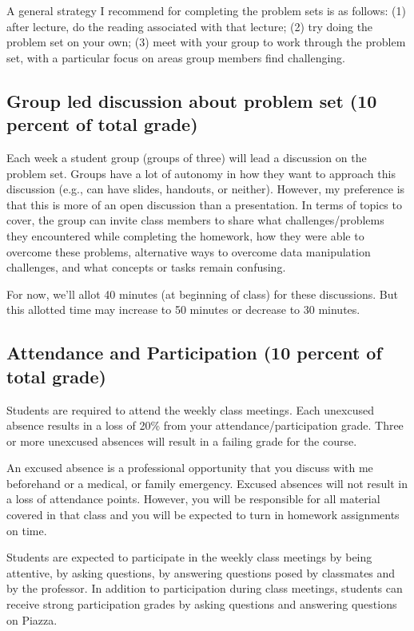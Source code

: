 \documentclass[11pt,]{article}
\begin{document}
A general strategy I recommend for completing the problem sets is as
follows: (1) after lecture, do the reading associated with that lecture;
(2) try doing the problem set on your own; (3) meet with your group to
work through the problem set, with a particular focus on areas group
members find challenging.

\subsection{Group led discussion about problem set (10 percent of total
grade)}\label{group-led-discussion-about-problem-set-10-percent-of-total-grade}

Each week a student group (groups of three) will lead a discussion on
the problem set. Groups have a lot of autonomy in how they want to
approach this discussion (e.g., can have slides, handouts, or neither).
However, my preference is that this is more of an open discussion than a
presentation. In terms of topics to cover, the group can invite class
members to share what challenges/problems they encountered while
completing the homework, how they were able to overcome these problems,
alternative ways to overcome data manipulation challenges, and what
concepts or tasks remain confusing.

For now, we'll allot 40 minutes (at beginning of class) for these
discussions. But this allotted time may increase to 50 minutes or
decrease to 30 minutes.

\subsection{Attendance and Participation (10 percent of total
grade)}\label{attendance-and-participation-10-percent-of-total-grade}

Students are required to attend the weekly class meetings. Each
unexcused absence results in a loss of 20\% from your
attendance/participation grade. Three or more unexcused absences will
result in a failing grade for the course.

An excused absence is a professional opportunity that you discuss with
me beforehand or a medical, or family emergency. Excused absences will
not result in a loss of attendance points. However, you will be
responsible for all material covered in that class and you will be
expected to turn in homework assignments on time.

Students are expected to participate in the weekly class meetings by
being attentive, by asking questions, by answering questions posed by
classmates and by the professor. In addition to participation during
class meetings, students can receive strong participation grades by
asking questions and answering questions on Piazza.
\end{document}
